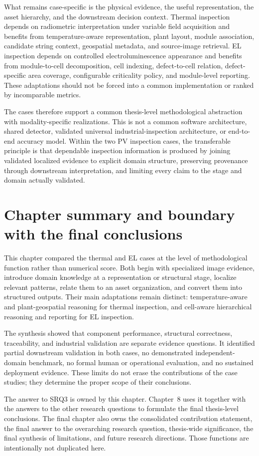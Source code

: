\documentclass[12pt,a4paper]{report}
\begin{document}
What remains case-specific is the physical evidence, the useful representation, the asset hierarchy, and the downstream decision context. Thermal inspection depends on radiometric interpretation under variable field acquisition and benefits from temperature-aware representation, plant layout, module association, candidate string context, geospatial metadata, and source-image retrieval. EL inspection depends on controlled electroluminescence appearance and benefits from module-to-cell decomposition, cell indexing, defect-to-cell relation, defect-specific area coverage, configurable criticality policy, and module-level reporting. These adaptations should not be forced into a common implementation or ranked by incomparable metrics.

The cases therefore support a common thesis-level methodological abstraction with modality-specific realizations. This is not a common software architecture, shared detector, validated universal industrial-inspection architecture, or end-to-end accuracy model. Within the two PV inspection cases, the transferable principle is that dependable inspection information is produced by joining validated localized evidence to explicit domain structure, preserving provenance through downstream interpretation, and limiting every claim to the stage and domain actually validated.

\section{Chapter summary and boundary with the final conclusions}
\label{sec:ch07-summary}

This chapter compared the thermal and EL cases at the level of methodological function rather than numerical score. Both begin with specialized image evidence, introduce domain knowledge at a representation or structural stage, localize relevant patterns, relate them to an asset organization, and convert them into structured outputs. Their main adaptations remain distinct: temperature-aware and plant-geospatial reasoning for thermal inspection, and cell-aware hierarchical reasoning and reporting for EL inspection.

The synthesis showed that component performance, structural correctness, traceability, and industrial validation are separate evidence questions. It identified partial downstream validation in both cases, no demonstrated independent-domain benchmark, no formal human or operational evaluation, and no sustained deployment evidence. These limits do not erase the contributions of the case studies; they determine the proper scope of their conclusions.

The answer to SRQ3 is owned by this chapter. Chapter~8 uses it together with the answers to the other research questions to formulate the final thesis-level conclusions. The final chapter also owns the consolidated contribution statement, the final answer to the overarching research question, thesis-wide significance, the final synthesis of limitations, and future research directions. Those functions are intentionally not duplicated here.



\end{document}
